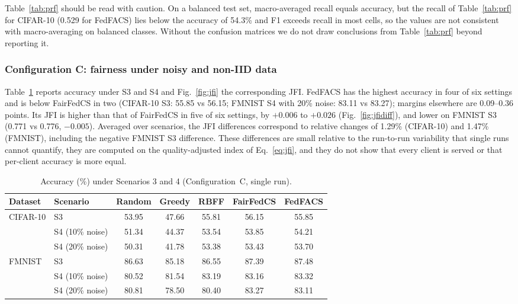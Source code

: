 \documentclass[pdflatex,sn-basic]{sn-jnl}
\begin{document}
Table~\ref{tab:prf} should be read with caution. On a balanced test set, macro-averaged recall equals accuracy, but the recall of Table~\ref{tab:prf} for CIFAR-10 (0.529 for FedFACS) lies below the accuracy of 54.3\% and F1 exceeds recall in most cells, so the values are not consistent with macro-averaging on balanced classes. Without the confusion matrices we do not draw conclusions from Table~\ref{tab:prf} beyond reporting it.

\subsubsection{Configuration C: fairness under noisy and non-IID data}
Table~\ref{tab:c} reports accuracy under S3 and S4 and Fig.~\ref{fig:jfi} the corresponding JFI. FedFACS has the highest accuracy in four of six settings and is below FairFedCS in two (CIFAR-10 S3: 55.85 vs 56.15; FMNIST S4 with 20\% noise: 83.11 vs 83.27); margins elsewhere are 0.09--0.36 points. Its JFI is higher than that of FairFedCS in five of six settings, by $+0.006$ to $+0.026$ (Fig.~\ref{fig:jfidiff}), and lower on FMNIST S3 (0.771 vs 0.776, $-0.005$). Averaged over scenarios, the JFI differences correspond to relative changes of 1.29\% (CIFAR-10) and 1.47\% (FMNIST), including the negative FMNIST S3 difference. These differences are small relative to the run-to-run variability that single runs cannot quantify, they are computed on the quality-adjusted index of Eq.~\eqref{eq:jfi}, and they do not show that every client is served or that per-client accuracy is more equal.

\begin{table}[t]
\caption{Accuracy (\%) under Scenarios 3 and 4 (Configuration~C, single run).}\label{tab:c}
\centering
\small
\begin{tabular}{llccccc}
\toprule
Dataset & Scenario & Random & Greedy & RBFF & FairFedCS & FedFACS\\
\midrule
CIFAR-10 & S3 & 53.95 & 47.66 & 55.81 & 56.15 & 55.85\\
 & S4 (10\% noise) & 51.34 & 44.37 & 53.54 & 53.85 & 54.21\\
 & S4 (20\% noise) & 50.31 & 41.78 & 53.38 & 53.43 & 53.70\\
FMNIST & S3 & 86.63 & 85.18 & 86.55 & 87.39 & 87.48\\
 & S4 (10\% noise) & 80.52 & 81.54 & 83.19 & 83.16 & 83.32\\
 & S4 (20\% noise) & 80.81 & 78.50 & 80.40 & 83.27 & 83.11\\
\bottomrule
\end{tabular}
\end{table}
\end{document}
